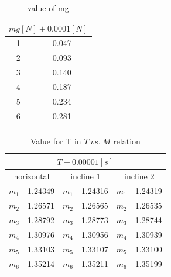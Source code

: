 \documentclass[11pt,a4paper]{article}
\begin{document}
        \begin{longtable}{|c|c|}
        \hline
        \multicolumn{2}{|c|}{$mg[N]\pm0.0001[N]$}\\\hline
        1 & 0.047 \\ \hline
        2 & 0.093 \\ \hline
        3 & 0.140 \\ \hline
        4 & 0.187 \\ \hline
        5 & 0.234 \\ \hline
        6 & 0.281 \\ \hline
        \caption{value of mg}
        \label{mg}
        \end{longtable}
        \begin{table}[H]
            \centering
            \begin{tabular}{|c|c|c|c|c|c|}
            \hline
            \multicolumn{6}{|c|}{$T\pm 0.00001[s]$}                                                            \\ \hline
            \multicolumn{2}{|c|}{horizontal} & \multicolumn{2}{c|}{incline 1} & \multicolumn{2}{c|}{incline 2} \\ \hline
            $m_1$          & 1.24349         & $m_1$         & 1.24316        & $m_1$         & 1.24319        \\ \hline
            $m_2$          & 1.26571         & $m_2$         & 1.26565        & $m_2$         & 1.26535        \\ \hline
            $m_3$          & 1.28792         & $m_3$         & 1.28773        & $m_3$         & 1.28744        \\ \hline
            $m_4$          & 1.30976         & $m_4$         & 1.30956        & $m_4$         & 1.30939        \\ \hline
            $m_5$          & 1.33103         & $m_5$         & 1.33107        & $m_5$         & 1.33100        \\ \hline
            $m_6$          & 1.35214         & $m_6$         & 1.35211        & $m_6$         & 1.35199        \\ \hline
            \end{tabular}
            \caption{Value for T in $T\ vs.\ M$ relation}
            \label{valuettm}
            \end{table}
\end{document}

